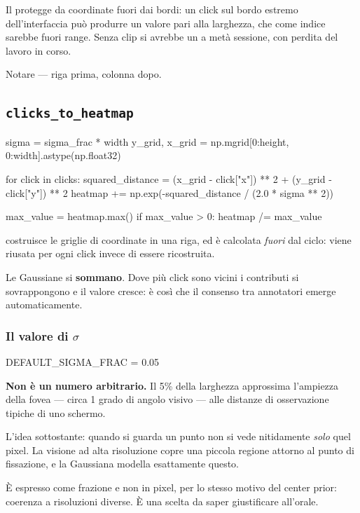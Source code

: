 Il  protegge da coordinate fuori dai bordi: un click sul bordo estremo
dell'interfaccia può produrre un valore pari alla larghezza, che come indice sarebbe fuori range.
Senza clip si avrebbe un  a metà sessione, con perdita del lavoro in corso.

Notare  --- riga prima, colonna dopo.

\subsection{\texttt{clicks\_to\_heatmap}}

\begin{idebox}
\begin{pycode}
sigma = sigma_frac * width
y_grid, x_grid = np.mgrid[0:height, 0:width].astype(np.float32)

for click in clicks:
    squared_distance = (x_grid - click["x"]) ** 2 + (y_grid - click["y"]) ** 2
    heatmap += np.exp(-squared_distance / (2.0 * sigma ** 2))

max_value = heatmap.max()
if max_value > 0:
    heatmap /= max_value
\end{pycode}
\end{idebox}

 costruisce le griglie di coordinate in una riga, ed è calcolata
\emph{fuori} dal ciclo: viene riusata per ogni click invece di essere ricostruita.

Le Gaussiane si \textbf{sommano}. Dove più click sono vicini i contributi si sovrappongono e il
valore cresce: è così che il consenso tra annotatori emerge automaticamente.

\subsubsection{Il valore di \texorpdfstring{$\sigma$}{sigma}}

\begin{idebox}
\begin{pycode}
DEFAULT_SIGMA_FRAC = 0.05
\end{pycode}
\end{idebox}

\begin{nota}
\textbf{Non è un numero arbitrario.} Il 5\% della larghezza approssima l'ampiezza della fovea
--- circa 1 grado di angolo visivo --- alle distanze di osservazione tipiche di uno schermo.

\medskip
L'idea sottostante: quando si guarda un punto non si vede nitidamente \emph{solo} quel pixel. La
visione ad alta risoluzione copre una piccola regione attorno al punto di fissazione, e la
Gaussiana modella esattamente questo.

\medskip
È espresso come frazione e non in pixel, per lo stesso motivo del center prior: coerenza a
risoluzioni diverse. È una scelta da saper giustificare all'orale.
\end{nota}

